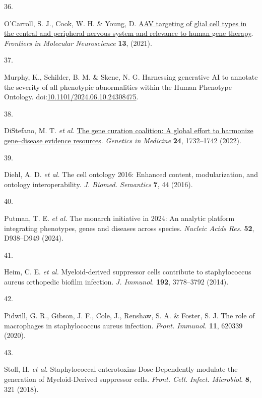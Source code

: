 \documentclass[
]{article}
\newlength{\cslhangindent}
\newlength{\csllabelwidth}
\newenvironment{CSLReferences}[2] %
 {\begin{list}{}{%
  \setlength{\itemindent}{0pt}
  \setlength{\leftmargin}{0pt}
  \setlength{\parsep}{0pt}
  \ifodd #1
   \setlength{\leftmargin}{\cslhangindent}
   \setlength{\itemindent}{-1\cslhangindent}
  \fi
  \setlength{\itemsep}{#2\baselineskip}}}
 {\end{list}}
\newcommand{\CSLLeftMargin}[1]{\parbox[t]{\csllabelwidth}{\strut#1\strut}}
\newcommand{\CSLRightInline}[1]{\parbox[t]{\linewidth - \csllabelwidth}{\strut#1\strut}}
\begin{document}
\begin{CSLReferences}{0}{0}
\CSLLeftMargin{36. }%
\CSLRightInline{O'Carroll, S. J., Cook, W. H. \& Young, D.
\href{https://doi.org/10.3389/fnmol.2020.618020}{AAV targeting of glial
cell types in the central and peripheral nervous system and relevance to
human gene therapy}. \emph{Frontiers in Molecular Neuroscience}
\textbf{13}, (2021).}

\CSLLeftMargin{37. }%
\CSLRightInline{Murphy, K., Schilder, B. M. \& Skene, N. G. Harnessing
generative AI to annotate the severity of all phenotypic abnormalities
within the Human Phenotype Ontology.
doi:\href{https://doi.org/10.1101/2024.06.10.24308475}{10.1101/2024.06.10.24308475}.}

\CSLLeftMargin{38. }%
\CSLRightInline{DiStefano, M. T. \emph{et al.}
\href{https://doi.org/10.1016/j.gim.2022.04.017}{The gene curation
coalition: A global effort to harmonize gene--disease evidence
resources}. \emph{Genetics in Medicine} \textbf{24}, 1732--1742 (2022).}

\CSLLeftMargin{39. }%
\CSLRightInline{Diehl, A. D. \emph{et al.} The cell ontology 2016:
Enhanced content, modularization, and ontology interoperability.
\emph{J. Biomed. Semantics} \textbf{7}, 44 (2016).}

\CSLLeftMargin{40. }%
\CSLRightInline{Putman, T. E. \emph{et al.} The monarch initiative in
2024: An analytic platform integrating phenotypes, genes and diseases
across species. \emph{Nucleic Acids Res.} \textbf{52}, D938--D949
(2024).}

\CSLLeftMargin{41. }%
\CSLRightInline{Heim, C. E. \emph{et al.} Myeloid-derived suppressor
cells contribute to staphylococcus aureus orthopedic biofilm infection.
\emph{J. Immunol.} \textbf{192}, 3778--3792 (2014).}

\CSLLeftMargin{42. }%
\CSLRightInline{Pidwill, G. R., Gibson, J. F., Cole, J., Renshaw, S. A.
\& Foster, S. J. The role of macrophages in staphylococcus aureus
infection. \emph{Front. Immunol.} \textbf{11}, 620339 (2020).}

\CSLLeftMargin{43. }%
\CSLRightInline{Stoll, H. \emph{et al.} Staphylococcal enterotoxins
{Dose-Dependently} modulate the generation of {Myeloid-Derived}
suppressor cells. \emph{Front. Cell. Infect. Microbiol.} \textbf{8}, 321
(2018).}


\end{CSLReferences}
\end{document}
